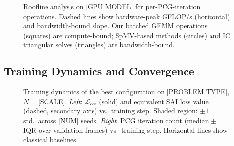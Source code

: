 \documentclass[acmtog,anonymous,review]{acmart}
\begin{document}
\begin{figure}[h]
  \centering
  \caption{Roofline analysis on [GPU MODEL] for per-PCG-iteration operations.
    Dashed lines show hardware-peak GFLOP/s (horizontal) and bandwidth-bound slope.
    Our batched GEMM operations (squares) are compute-bound; SpMV-based methods (circles)
    and IC triangular solves (triangles) are bandwidth-bound.
  }
  \label{fig:roofline}
\end{figure}

\subsection{Training Dynamics and Convergence}
\label{sec:results:training}

\begin{figure}[h]
  \centering
  \caption{Training dynamics of the best configuration on [PROBLEM TYPE], $N = $[SCALE].
    \emph{Left}: $\mathcal{L}_{\mathrm{cos}}$ (solid) and equivalent SAI loss value (dashed, secondary
    axis) vs.\ training step.  Shaded region: $\pm 1$ std.\ across [NUM] seeds.
    \emph{Right}: PCG iteration count (median $\pm$ IQR over validation frames) vs.\ training step.
    Horizontal lines show classical baselines.
  }
  \label{fig:training:dynamics}
\end{figure}
\end{document}
